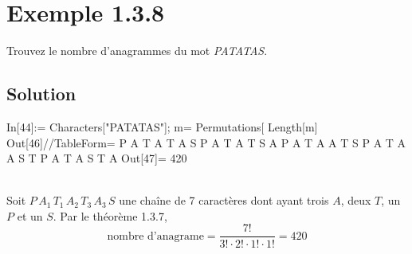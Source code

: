 \section*{Exemple 1.3.8}
	Trouvez le nombre d'anagrammes du mot \textit{PATATAS}.
\subsection*{Solution}
\begin{multicols}{2}
\begin{verbbox}
In[44]:= Characters["PATATAS"];
m= Permutations[%
Length[m]
Out[46]//TableForm=
P	A	T	A	T	A	S
P	A	T	A	T	S	A
P	A	T	A	A	T	S
P	A	T	A	A	S	T
P	A	T	A	S	T	A
Out[47]= 420
	\end{verbbox}
	\theverbbox
	\columnbreak
	\\
	Soit $P\,A_1\,T_1\,A_2\,T_3\,A_3\,S$ une chaîne de 7 caractères dont ayant trois $A$, deux $T$, un $P$ et un $S$. Par le théorème 1.3.7,
	\begin{equation*}\text{nombre d'anagrame}=\frac{7!}{3!\cdot 2!\cdot 1!\cdot 1!}=420\end{equation*}
\end{multicols}